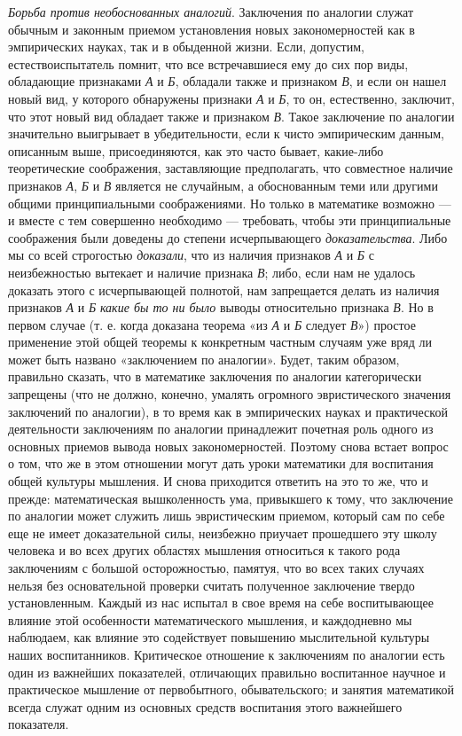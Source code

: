 \documentclass[12pt, a4paper, openany]{book}
\begin{document}
\textit{Борьба против необоснованных аналогий}. Заключения по аналогии служат обычным и законным приемом  установления новых закономерностей как в эмпирических науках, так и в обыденной жизни. Если, допустим,  естествоиспытатель помнит, что все встречавшиеся ему до сих пор виды, обладающие признаками \textit{А} и \textit{Б}, обладали также и признаком \textit{В}, и если он нашел новый вид, у которого 
обнаружены признаки \textit{А} и \textit{Б}, то он, естественно,   заключит, что этот новый вид обладает также и признаком \textit{В}. Такое заключение по аналогии значительно выигрывает в убедительности, если к чисто эмпирическим данным, описанным выше, присоединяются, как это часто  бывает, какие-либо теоретические соображения,  заставляющие предполагать, что совместное наличие признаков \textit{А}, \textit{Б} и \textit{В} является не случайным, а обоснованным теми или другими общими принципиальными соображениями. Но только в математике возможно — и вместе с тем совершенно необходимо — требовать, чтобы эти принципиальные соображения были доведены до степени  исчерпывающего \textit{доказательства}. Либо мы со всей строгостью \textit{доказали}, что из наличия признаков \textit{А} и \textit{Б} с неизбежностью вытекает и наличие признака \textit{В}; либо, если нам не удалось доказать этого с исчерпывающей полнотой, нам запрещается делать из наличия признаков \textit{А} и \textit{Б} \textit{какие бы то ни было}  выводы относительно признака \textit{В}. Но в первом случае (т. е. когда доказана теорема «из \textit{А} и \textit{Б} следует \textit{В}») простое  применение этой общей теоремы к конкретным частным случаям уже вряд ли может быть названо «заключением по  аналогии». Будет, таким образом, правильно сказать, что в математике заключения по аналогии категорически  запрещены (что не должно, конечно, умалять огромного  эвристического значения заключений по аналогии), в то время как в эмпирических науках и практической деятельности заключениям по аналогии принадлежит почетная роль одного из основных приемов вывода новых закономерностей. Поэтому снова встает вопрос о том, что же в этом  отношении могут дать уроки математики для воспитания общей культуры мышления. И снова приходится ответить на это то же, что и прежде: математическая вышколенность ума, привыкшего к тому, что заключение по аналогии может служить лишь эвристическим приемом, который сам по себе еще не имеет доказательной силы, неизбежно приучает прошедшего эту школу человека и во всех  других областях мышления относиться к такого рода  заключениям с большой осторожностью, памятуя, что во всех таких случаях нельзя без основательной проверки  считать полученное заключение твердо установленным.  Каждый из нас испытал в свое время на себе воспитывающее влияние этой особенности математического мышления, и каждодневно мы наблюдаем, как влияние это содействует повышению мыслительной культуры наших  воспитанников. Критическое отношение к заключениям по аналогии есть один из важнейших показателей, отличающих  правильно воспитанное научное и практическое мышление от первобытного, обывательского; и занятия математикой всегда служат одним из основных средств воспитания этого важнейшего показателя. 
\end{document}
